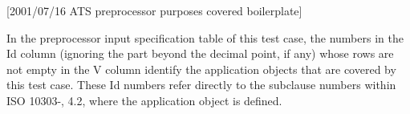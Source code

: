 [2001/07/16 ATS preprocessor purposes covered boilerplate]

    In the preprocessor input specification table of this test case, the
numbers in the Id column (ignoring the part beyond the decimal point, if any)
whose rows are not empty in the V column identify the application objects
that are covered by this test case. These Id numbers refer directly to
the subclause numbers within ISO 10303-\theAPpartno, 4.2, where the
application object is defined.
\par

\endinput
